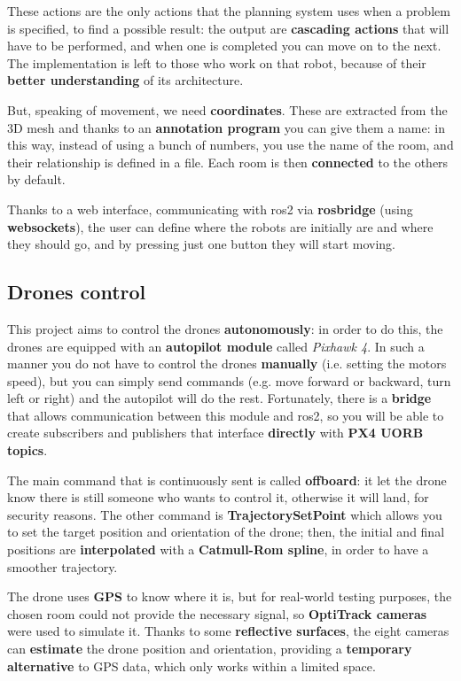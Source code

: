 \bigskip

These actions are the only actions that the planning system uses when a problem is specified, to find a possible result: the output are \textbf{cascading actions} that will have to be performed, and when one is completed you can move on to the next. The implementation is left to those who work on that robot, because of their \textbf{better understanding} of its architecture.

But, speaking of movement, we need \textbf{coordinates}. These are extracted from the 3D mesh and thanks to an \textbf{annotation program} you can give them a name: in this way, instead of using a bunch of numbers, you use the name of the room, and their relationship is defined in a file. Each room is then \textbf{connected} to the others by default.

Thanks to a web interface, communicating with \acrshort{ros}2 via \textbf{rosbridge} (using \textbf{websockets}), the user can define where the robots are initially are and where they should go, and by pressing just one button they will start moving.   

\subsection{Drones control}

This project aims to control the drones \textbf{autonomously}: in order to do this, the drones are equipped with an \textbf{autopilot module} called \textit{Pixhawk 4}. In such a manner you do not have to control the drones \textbf{manually} (i.e. setting the motors speed), but you can simply send commands (e.g. move forward or backward, turn left or right) and the autopilot will do the rest. Fortunately, there is a \textbf{bridge} that allows communication between this module and \acrshort{ros}2, so you will be able to create subscribers and publishers that interface \textbf{directly} with \textbf{PX4 UORB topics}\cite{px4}.

The main command that is continuously sent is called \textbf{offboard}: it let the drone know there is still someone who wants to control it, otherwise it will land, for security reasons. The other command is \textbf{TrajectorySetPoint} which allows you to set the target position and orientation of the drone; then, the initial and final positions are \textbf{interpolated} with a \textbf{Catmull-Rom spline}, in order to have a smoother trajectory.

The drone uses \textbf{GPS} to know where it is, but for real-world testing purposes, the chosen room could not provide the necessary signal, so \textbf{OptiTrack cameras} were used to simulate it. Thanks to some \textbf{reflective surfaces}, the eight cameras can \textbf{estimate} the drone position and orientation, providing a \textbf{temporary alternative} to GPS data, which only works within a limited space.

